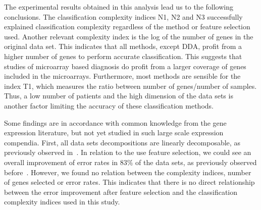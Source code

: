 \documentclass[10pt]{bmc_article}
\newenvironment{bmcformat}{\begin{raggedright}\baselineskip20pt\sloppy\setboolean{publ}{false}}{\end{raggedright}\baselineskip20pt\sloppy}
\begin{document}
\begin{bmcformat}
The experimental results obtained in this analysis lead us to the
following conclusions. The classification complexity indices N1, N2
and N3 successfully explained classification complexity regardless of
the method or feature selection used. Another relevant complexity
index is the log of the number of genes in the original data set. This
indicates that all methods, except DDA, profit from a higher number of
genes to perform accurate classification. This suggests that studies
of microarray based diagnosis do profit from a larger coverage of
genes included in the microarrays. Furthermore, most methods are
sensible for the index T1, which measures the ratio between number of
genes/number of samples. Thus, a low number of patients and the high
dimension of the data sets is another factor limiting the accuracy of
these classification methods.


Some findings are in accordance with common knowledge from the gene
expression literature, but not yet studied in such large scale
expression compendia. First, all data sets decompositions are linearly
decomposable, as previously observed in~\cite{Lorena2008}. In relation
to the use feature selection, we could see an overall improvement of
error rates in $83\%$ of the data sets, as previously observed
before~\cite{Song2007,Statnikov2005,Tibshirani2002}. However, we found
no relation between the complexity indices, number of genes selected
or error rates. This indicates that there is no direct relationship
between the error improvement after feature selection and the
classification complexity indices used in this study.




\end{bmcformat}
\end{document}

